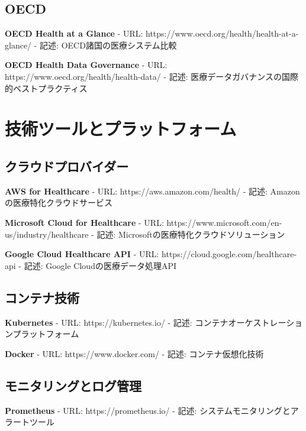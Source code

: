 \documentclass[
  a4paper,
  a4paper,
  11pt]{ltjsbook}
\begin{document}
\subsection{OECD}\label{oecd}

\textbf{OECD Health at a Glance} - URL:
https://www.oecd.org/health/health-at-a-glance/ - 記述:
OECD諸国の医療システム比較

\textbf{OECD Health Data Governance} - URL:
https://www.oecd.org/health/health-data/ - 記述:
医療データガバナンスの国際的ベストプラクティス

\section{技術ツールとプラットフォーム}\label{ux6280ux8853ux30c4ux30fcux30ebux3068ux30d7ux30e9ux30c3ux30c8ux30d5ux30a9ux30fcux30e0}

\subsection{クラウドプロバイダー}\label{ux30afux30e9ux30a6ux30c9ux30d7ux30edux30d0ux30a4ux30c0ux30fc}

\textbf{AWS for Healthcare} - URL: https://aws.amazon.com/health/ -
記述: Amazonの医療特化クラウドサービス

\textbf{Microsoft Cloud for Healthcare} - URL:
https://www.microsoft.com/en-us/industry/healthcare - 記述:
Microsoftの医療特化クラウドソリューション

\textbf{Google Cloud Healthcare API} - URL:
https://cloud.google.com/healthcare-api - 記述: Google
Cloudの医療データ処理API

\subsection{コンテナ技術}\label{ux30b3ux30f3ux30c6ux30caux6280ux8853}

\textbf{Kubernetes} - URL: https://kubernetes.io/ - 記述:
コンテナオーケストレーションプラットフォーム

\textbf{Docker} - URL: https://www.docker.com/ - 記述:
コンテナ仮想化技術

\subsection{モニタリングとログ管理}\label{ux30e2ux30cbux30bfux30eaux30f3ux30b0ux3068ux30edux30b0ux7ba1ux7406}

\textbf{Prometheus} - URL: https://prometheus.io/ - 記述:
システムモニタリングとアラートツール
\end{document}
